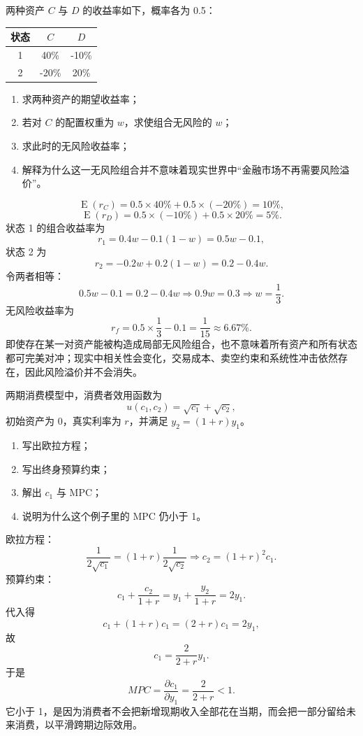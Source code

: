 \begin{question}
两种资产 $C$ 与 $D$ 的收益率如下，概率各为 0.5：
\begin{center}
\begin{tabular}{c|cc}
状态 & $C$ & $D$\\\hline
1 & 40\% & -10\%\\
2 & -20\% & 20\%
\end{tabular}
\end{center}
\begin{enumerate}[label=(\alph*),leftmargin=2.5em]
  \item 求两种资产的期望收益率；
  \item 若对 $C$ 的配置权重为 $w$，求使组合无风险的 $w$；
  \item 求此时的无风险收益率；
  \item 解释为什么这一无风险组合并不意味着现实世界中“金融市场不再需要风险溢价”。
\end{enumerate}
\begin{solution}
\[
\operatorname{E}(r_C)=0.5\times40\%+0.5\times(-20\%)=10\%,
\]
\[
\operatorname{E}(r_D)=0.5\times(-10\%)+0.5\times20\%=5\%.
\]
状态 1 的组合收益率为
\[
r_1=0.4w-0.1(1-w)=0.5w-0.1,
\]
状态 2 为
\[
r_2=-0.2w+0.2(1-w)=0.2-0.4w.
\]
令两者相等：
\[
0.5w-0.1=0.2-0.4w\Rightarrow 0.9w=0.3\Rightarrow w=\frac13.
\]
无风险收益率为
\[
r_f=0.5\times\frac13-0.1=\frac{1}{15}\approx 6.67\%.
\]
即使存在某一对资产能被构造成局部无风险组合，也不意味着所有资产和所有状态都可完美对冲；现实中相关性会变化，交易成本、卖空约束和系统性冲击依然存在，因此风险溢价并不会消失。
\end{solution}
\end{question}

\begin{question}
两期消费模型中，消费者效用函数为
\[
u(c_1,c_2)=\sqrt{c_1}+\sqrt{c_2},
\]
初始资产为 0，真实利率为 $r$，并满足 $y_2=(1+r)y_1$。
\begin{enumerate}[label=(\alph*),leftmargin=2.5em]
  \item 写出欧拉方程；
  \item 写出终身预算约束；
  \item 解出 $c_1$ 与 MPC；
  \item 说明为什么这个例子里的 MPC 仍小于 1。
\end{enumerate}
\begin{solution}
欧拉方程：
\[
\frac{1}{2\sqrt{c_1}}=(1+r)\frac{1}{2\sqrt{c_2}}
\Rightarrow c_2=(1+r)^2c_1.
\]
预算约束：
\[
c_1+\frac{c_2}{1+r}=y_1+\frac{y_2}{1+r}=2y_1.
\]
代入得
\[
c_1+(1+r)c_1=(2+r)c_1=2y_1,
\]
故
\[
c_1=\frac{2}{2+r}y_1.
\]
于是
\[
MPC=\frac{\partial c_1}{\partial y_1}=\frac{2}{2+r}<1.
\]
它小于 1，是因为消费者不会把新增现期收入全部花在当期，而会把一部分留给未来消费，以平滑跨期边际效用。
\end{solution}
\end{question}


